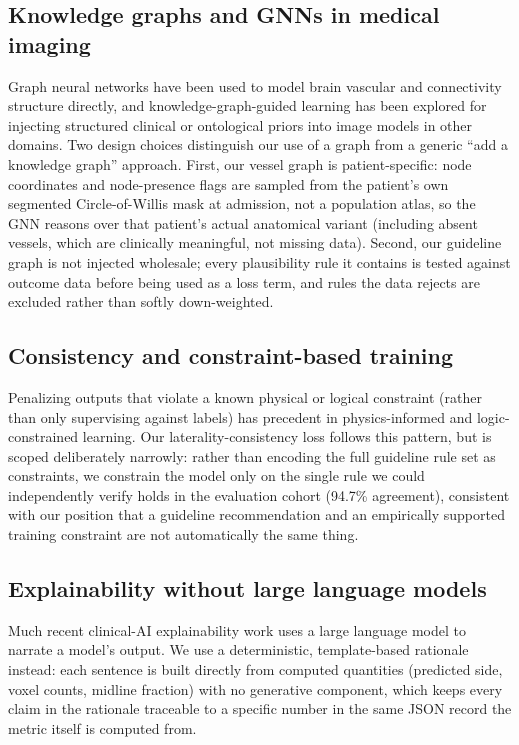 \documentclass[conference]{IEEEtran}
\begin{document}
\subsection{Knowledge graphs and GNNs in medical imaging}
Graph neural networks have been used to model brain vascular and connectivity structure directly, and knowledge-graph-guided learning has been explored for injecting structured clinical or ontological priors into image models in other domains. Two design choices distinguish our use of a graph from a generic ``add a knowledge graph'' approach. First, our vessel graph is patient-specific: node coordinates and node-presence flags are sampled from the patient's own segmented Circle-of-Willis mask at admission, not a population atlas, so the GNN reasons over that patient's actual anatomical variant (including absent vessels, which are clinically meaningful, not missing data). Second, our guideline graph is not injected wholesale; every plausibility rule it contains is tested against outcome data before being used as a loss term, and rules the data rejects are excluded rather than softly down-weighted.

\subsection{Consistency and constraint-based training}
Penalizing outputs that violate a known physical or logical constraint (rather than only supervising against labels) has precedent in physics-informed and logic-constrained learning. Our laterality-consistency loss follows this pattern, but is scoped deliberately narrowly: rather than encoding the full guideline rule set as constraints, we constrain the model only on the single rule we could independently verify holds in the evaluation cohort (94.7\% agreement), consistent with our position that a guideline recommendation and an empirically supported training constraint are not automatically the same thing.

\subsection{Explainability without large language models}
Much recent clinical-AI explainability work uses a large language model to narrate a model's output. We use a deterministic, template-based rationale instead: each sentence is built directly from computed quantities (predicted side, voxel counts, midline fraction) with no generative component, which keeps every claim in the rationale traceable to a specific number in the same JSON record the metric itself is computed from.
\end{document}

